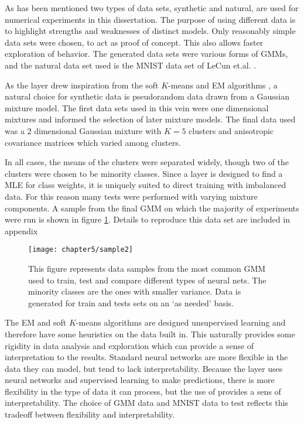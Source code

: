 \label{sect:dataSelection}

As has been mentioned two types of data sets, synthetic and natural, are used for numerical experiments in this dissertation. The purpose of using different data is to highlight strengths and weaknesses of distinct models. Only reasonably simple data sets were chosen, to act as proof of concept. This also allows faster exploration of \RS behavior. The generated data sets were various forms of GMMs, and the natural data set used is the MNIST data set of LeCun et.al. \cite{lecun1998gradient}.

As the \RS layer drew inspiration from the soft \( K \)-means and EM algorithms \cite{MacKay2002}, a natural choice for synthetic data is pseudorandom data drawn from a Gaussian mixture model. The first data sets used in this vein were one dimensional mixtures and informed the selection of later mixture models. The final data used was a 2 dimensional Gaussian mixture with \( K=5 \) clusters and anisotropic covariance matrices which varied among clusters.  

In all cases, the means of the clusters were separated widely, though two of the clusters were chosen to be minority classes.  Since a \RS layer is designed to find a MLE for class weights, it is uniquely suited to direct training with imbalanced data. For this reason many tests were performed with varying mixture components. A sample from the final GMM on which the majority of experiments were run is shown in figure \ref{fig:sampleGMM_K5}.  Details to reproduce this data set are included in appendix 

\begin{figure}[h]
	\centering
	\texttt{[image: chapter5/sample2]}
	\caption[A sample GMM data set used for training and testing]{This figure represents data samples from the most common GMM used to train, test and compare different types of neural nets. The minority classes are the ones with smaller variance. Data is generated for train and tests sets on an `as needed' basis.}
	\label{fig:sampleGMM_K5}
\end{figure}

The EM and soft \( K \)-means algorithms are designed unsupervised learning and therefore have some heuristics on the data built in. This naturally provides some rigidity in data analysis and exploration which can provide a sense of interpretation to the results. Standard neural networks are more flexible in the data they can model, but tend to lack interpretability. Because the \RS layer uses neural networks and supervised learning to make predictions, there is more flexibility in the type of data it can process, but the use of \DR provides a sens of interpretability.  The choice of GMM data and MNIST data to test \RS reflects this tradeoff between flexibility and interpretability.

